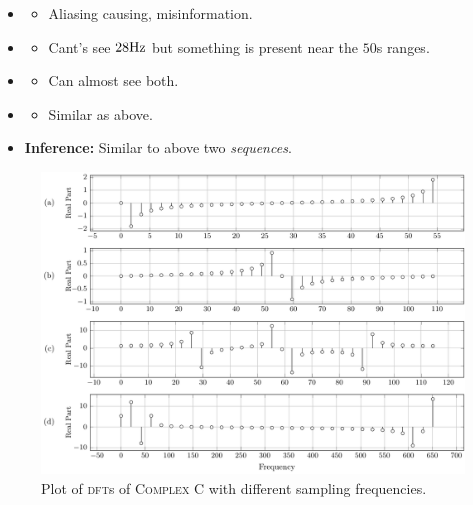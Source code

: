 \documentclass[../../course]{subfiles}
\begin{document}
\begin{itemize} [label=]

    \item \sampFreqMuchLess
        \begin{itemize} [label=]
            \item Aliasing causing, misinformation.
        \end{itemize}

    \item \sampFreqNorm
        \begin{itemize} [label=]
            \item Cant's see $\freqXOne \si{Hz}$ but something is present near the $50$s ranges.
        \end{itemize}

    \item \sampFreqSligGreat
        \begin{itemize} [label=]
            \item Can almost see both.
        \end{itemize}

    \item \sampFreqMuchGreat
        \begin{itemize} [label=]
            \item Similar as above.
        \end{itemize}

    \item \textbf{Inference:} Similar to above two \emph{sequences}.

\end{itemize}

\vfill

\begin{figure} [H]
    \centering
     {
        \includegraphics[height = 0.8\textheight] {tikzpics/plotDftComplexC32.pdf}
    }
     {Plot of \textsc{dft}s of \textsc{Complex C} with different sampling frequencies.}
    \label{plt:dftCplxC32}
\end{figure}
\end{document}
